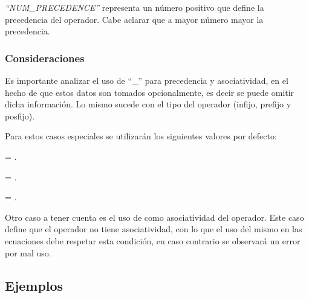 \textit{``NUM\_PRECEDENCE''} representa un número positivo que define la precedencia del operador. Cabe aclarar que a mayor número mayor la precedencia.

\subsubsection*{Consideraciones}
\label{subsubsec:operconsi}

Es importante analizar el uso de ``\_'' para precedencia y asociatividad, en el hecho de que estos datos son tomados opcionalmente, es decir se puede omitir dicha información. Lo mismo sucede con el tipo del operador (infijo, prefijo y posfijo). 

Para estos casos especiales se utilizarán los siguientes valores por defecto:

\begin{description}
\label{desc:default}
\item [Precedencia] = .

\item [Asociatividad] = .

\item [Tipo de operador] = .
\end{description}

Otro caso a tener cuenta es el uso de  como asociatividad del operador. Este caso define que el operador no tiene asociatividad, con lo que el uso del mismo en las ecuaciones debe respetar esta condición, en caso contrario se observará un error por mal uso.

\subsection*{Ejemplos}

